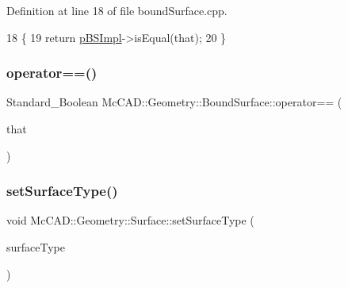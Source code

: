 Definition at line 18 of file bound\+Surface.\+cpp.


\begin{DoxyCode}
18                                                                             \{
19   \textcolor{keywordflow}{return} \hyperlink{classMcCAD_1_1Geometry_1_1BoundSurface_ae678fabb46e22b7a68a336051b366ddf}{pBSImpl}->isEqual(that);
20 \}
\end{DoxyCode}
\mbox{\label{classMcCAD_1_1Geometry_1_1BoundSurface_a5c7eafa600bd89b55fa06ddb9b21cc08}} 
\subsubsection{\texorpdfstring{operator==()}{operator==()}\hspace{0.1cm}{\footnotesize\ttfamily [2/2]}}
{\footnotesize\ttfamily Standard\+\_\+\+Boolean Mc\+C\+A\+D\+::\+Geometry\+::\+Bound\+Surface\+::operator== (\begin{DoxyParamCaption}\item[{const \hyperlink{classMcCAD_1_1Geometry_1_1BoundSurface}{Bound\+Surface} \&}]{that }\end{DoxyParamCaption})}

\mbox{\label{classMcCAD_1_1Geometry_1_1Surface_a976893834481e58569db0d35db2ba969}} 
\subsubsection{\texorpdfstring{set\+Surface\+Type()}{setSurfaceType()}\hspace{0.1cm}{\footnotesize\ttfamily [1/2]}}
{\footnotesize\ttfamily void Mc\+C\+A\+D\+::\+Geometry\+::\+Surface\+::set\+Surface\+Type (\begin{DoxyParamCaption}\item[{const std\+::string \&}]{surface\+Type }\end{DoxyParamCaption})\hspace{0.3cm}{\ttfamily [inherited]}}

